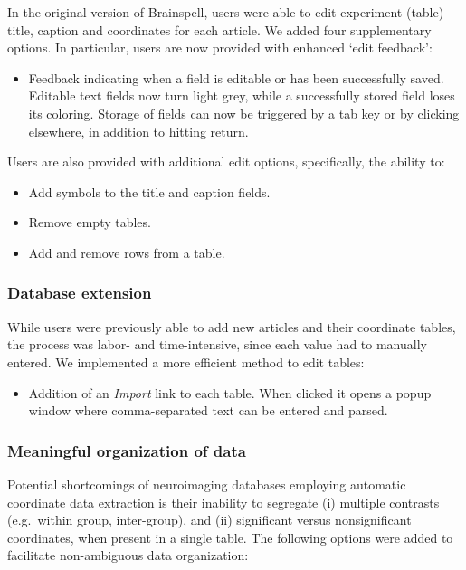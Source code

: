 \documentclass[twocolumn]{bmcart}%
\providecommand{\tightlist}{%
  \setlength{\itemsep}{0pt}\setlength{\parskip}{0pt}}
\begin{document}
In the original version of Brainspell, users were able to edit
experiment (table) title, caption and coordinates for each article. We
added four supplementary options. In particular, users are now provided
with enhanced `edit feedback':

\begin{itemize}
\item Feedback indicating when a field is editable or has been successfully saved. Editable text fields now turn light grey, while a successfully stored field loses its coloring. Storage of fields can now be triggered by a tab key or by clicking elsewhere, in addition to hitting return.
\end{itemize}\vspace{1ex}

\noindent Users are also provided with additional edit options,
specifically, the ability to:

\begin{itemize}
\item Add symbols to the title and caption fields.
\item Remove empty tables.
\item Add and remove rows from a table. 
\end{itemize}

\subsubsection{Database extension}\label{database-extension}

While users were previously able to add new articles and their
coordinate tables, the process was labor- and time-intensive, since each
value had to manually entered. We implemented a more efficient method to
edit tables:

\begin{itemize}
\tightlist
\item
  Addition of an \emph{Import} link to each table. When clicked it opens
  a popup window where comma-separated text can be entered and parsed.
\end{itemize}

\subsubsection{Meaningful organization of
data}\label{meaningful-organization-of-data}

Potential shortcomings of neuroimaging databases employing automatic
coordinate data extraction is their inability to segregate (i) multiple
contrasts (e.g.~within group, inter-group), and (ii) significant versus
nonsignificant coordinates, when present in a single table. The
following options were added to facilitate non-ambiguous data
organization:
\end{document}
